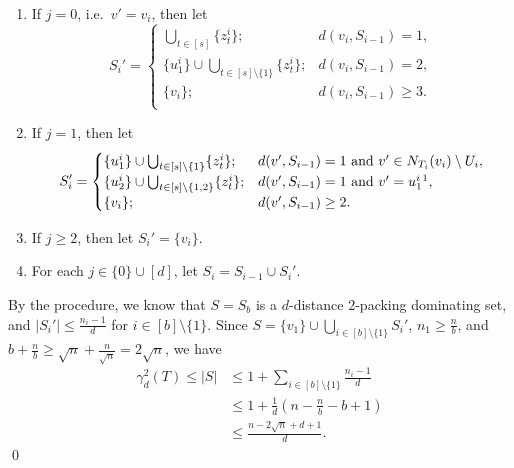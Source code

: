 \documentclass[12pt]{article}
\begin{document}
    \begin{enumerate}[(1)]
    \item If $j=0$, i.e.\ $v'=v_i$, then let
    $$
    S_i'=
    \begin{cases}
	\bigcup_{t \in [s]}\{z_{t}^{i}\}; & d(v_i,S_{i-1})=1 ,\\
	\{u_1^i\} \cup \bigcup_{t \in [s] \setminus \{1\}}\{z_{t}^{i}\}; & d(v_i,S_{i-1})=2,\\
	\{v_i\}; & d(v_i,S_{i-1}) \geq 3.\\
    \end{cases}
    $$ 

    \item If $j=1$, then let
    $$
    S_i'=
    \begin{cases}
	\{u_1^i\} \cup \bigcup_{t \in [s] \setminus \{1\}}\{z_{t}^{i}\}; & d(v',S_{i-1})=1 \text{ and } v' \in N_{T_i}(v_i) \setminus U_i, \\
	\{u_2^i\} \cup \bigcup_{t \in [s] \setminus \{1,2\}}\{z_{t}^{i}\}; & d(v',S_{i-1})=1 \text{ and } v' = u_1^i \footnotemark,\\
	\{v_i\}; & d(v',S_{i-1}) \geq 2.\\
    \end{cases}
    $$ 

    \item If $j \geq 2$, then let $S_{i}'= \{v_i\}$.

    \item For each $j \in \{0\} \cup [d]$, let $S_{i}=S_{i-1} \cup S_i'$.
    \end{enumerate}

    By the procedure, we know that $S=S_b$ is a $d$-distance $2$-packing dominating set, and $|S_i'| \leq \frac{n_i-1}{d}$ for $i \in [b] \setminus \{1\}$. Since $S=\{v_1\} \cup \bigcup_{i \in [b] \setminus \{1\}}S_i'$, $n_1 \geq \frac{n}{b}$, and $b+\frac{n}{b} \geq \sqrt{n}+\frac{n}{\sqrt{n}}=2\sqrt{n}$, we have
    \begin{equation*}
	\begin{aligned}
		\gamma_d^2(T) \leq |S| &\leq 1+\sum_{i \in [b] \setminus \{1\}}\frac{n_i-1}{d}\\
		&\leq 1+\frac{1}{d}(n-\frac{n}{b}-b+1)\\
		&\leq \frac{n-2\sqrt{n}+d+1}{d}.
	\end{aligned}
    \end{equation*}
\qed    
\end{document}
